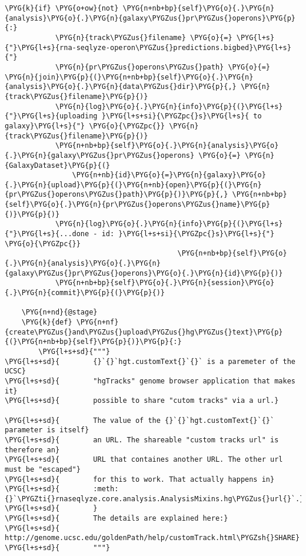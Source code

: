 \begin{Verbatim}[commandchars=\\\{\}]
        \PYG{k}{if} \PYG{o+ow}{not} \PYG{n+nb+bp}{self}\PYG{o}{.}\PYG{n}{analysis}\PYG{o}{.}\PYG{n}{galaxy\PYGZus{}pr\PYGZus{}operons}\PYG{p}{:}
            \PYG{n}{track\PYGZus{}filename} \PYG{o}{=} \PYG{l+s}{"}\PYG{l+s}{rna-seqlyze-operon\PYGZus{}predictions.bigbed}\PYG{l+s}{"}
            \PYG{n}{pr\PYGZus{}operons\PYGZus{}path} \PYG{o}{=} \PYG{n}{join}\PYG{p}{(}\PYG{n+nb+bp}{self}\PYG{o}{.}\PYG{n}{analysis}\PYG{o}{.}\PYG{n}{data\PYGZus{}dir}\PYG{p}{,} \PYG{n}{track\PYGZus{}filename}\PYG{p}{)}
            \PYG{n}{log}\PYG{o}{.}\PYG{n}{info}\PYG{p}{(}\PYG{l+s}{"}\PYG{l+s}{uploading }\PYG{l+s+si}{\PYGZpc{}s}\PYG{l+s}{ to galaxy}\PYG{l+s}{"} \PYG{o}{\PYGZpc{}} \PYG{n}{track\PYGZus{}filename}\PYG{p}{)}
            \PYG{n+nb+bp}{self}\PYG{o}{.}\PYG{n}{analysis}\PYG{o}{.}\PYG{n}{galaxy\PYGZus{}pr\PYGZus{}operons} \PYG{o}{=} \PYG{n}{GalaxyDataset}\PYG{p}{(}
                \PYG{n+nb}{id}\PYG{o}{=}\PYG{n}{galaxy}\PYG{o}{.}\PYG{n}{upload}\PYG{p}{(}\PYG{n+nb}{open}\PYG{p}{(}\PYG{n}{pr\PYGZus{}operons\PYGZus{}path}\PYG{p}{)}\PYG{p}{,} \PYG{n+nb+bp}{self}\PYG{o}{.}\PYG{n}{pr\PYGZus{}operons\PYGZus{}name}\PYG{p}{)}\PYG{p}{)}
            \PYG{n}{log}\PYG{o}{.}\PYG{n}{info}\PYG{p}{(}\PYG{l+s}{"}\PYG{l+s}{...done - id: }\PYG{l+s+si}{\PYGZpc{}s}\PYG{l+s}{"} \PYG{o}{\PYGZpc{}}
                                         \PYG{n+nb+bp}{self}\PYG{o}{.}\PYG{n}{analysis}\PYG{o}{.}\PYG{n}{galaxy\PYGZus{}pr\PYGZus{}operons}\PYG{o}{.}\PYG{n}{id}\PYG{p}{)}
            \PYG{n+nb+bp}{self}\PYG{o}{.}\PYG{n}{session}\PYG{o}{.}\PYG{n}{commit}\PYG{p}{(}\PYG{p}{)}

    \PYG{n+nd}{@stage}
    \PYG{k}{def} \PYG{n+nf}{create\PYGZus{}and\PYGZus{}upload\PYGZus{}hg\PYGZus{}text}\PYG{p}{(}\PYG{n+nb+bp}{self}\PYG{p}{)}\PYG{p}{:}
        \PYG{l+s+sd}{"""}
\PYG{l+s+sd}{        {}`{}`hgt.customText{}`{}` is a paremeter of the UCSC}
\PYG{l+s+sd}{        "hgTracks" genome browser application that makes it}
\PYG{l+s+sd}{        possible to share "cutom tracks" via a url.}

\PYG{l+s+sd}{        The value of the {}`{}`hgt.customText{}`{}` parameter is itself}
\PYG{l+s+sd}{        an URL. The shareable "custom tracks url" is therefore an}
\PYG{l+s+sd}{        URL that containes another URL. The other url must be "escaped"}
\PYG{l+s+sd}{        for this to work. That actually happens in}
\PYG{l+s+sd}{        :meth:{}`\PYGZti{}rnaseqlyze.core.analysis.AnalysisMixins.hg\PYGZus{}url{}`.}
\PYG{l+s+sd}{        }
\PYG{l+s+sd}{        The details are explained here:}
\PYG{l+s+sd}{        http://genome.ucsc.edu/goldenPath/help/customTrack.html\PYGZsh{}SHARE}
\PYG{l+s+sd}{        """}


\end{Verbatim}
